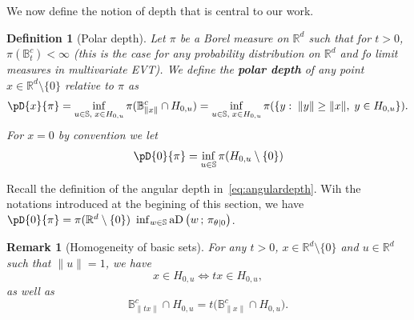\documentclass{article}
\numberwithin{equation}{section}
\newtheorem{definition}{Definition}[section]
\newtheorem{remark}{Remark}[section]
\newcommand{\rset}{\mathbb{R}}
\newcommand{\sphere}{\mathbb{S}}
\newcommand{\ball}{\mathbb{B}}
\newcommand{\AHS}[1]{H_{0, {#1}} }
\newcommand{\coD}[2]{\pD{#1}{#2}}
\newcommand{\aD}[2]{{\mathrm{aD}}\left({#1}\,;\,{#2}\right)}
\begin{document}

We now define the  notion of depth that is central to our work.
\begin{definition}[Polar depth]\label{def:coD}
    Let $\pi$ be a Borel measure on $\rset^d$ such that for $t>0$,
    $\pi(\ball_t^c)<\infty$ (this is the case for any probability
    distribution on $\rset^d$ and fo limit measures in multivariate EVT). We define the \textbf{polar depth}
    of any point $x\in\rset^d\setminus\{0\}$ relative to $\pi$ as
    \begin{equation}
        \label{eq:codepth}
            \coD{x}{\pi}  = \inf_{u \in\sphere,\; x \in \AHS{u} }\pi(
            \ball_{\|x\|}^c\cap \AHS{u} )    
             = \inf_{u\in\sphere , \; x \in \AHS{u} }\pi(\{y:\;  \|y\|  \ge
            \|x\|, \;y \in \AHS{u}\}).
          \end{equation}
          For $x=0$ by convention we let
          $$
\coD{0}{\pi} = \inf_{u \in\sphere }\pi(\AHS{u}\setminus\{0\} ) 
$$

\end{definition}

Recall the definition of the angular depth in~\eqref{eq:angulardepth}.
 Wih  the notations introduced at the begining of this section,  we have
$\coD{0}{\pi} =  \pi(\rset^d\setminus\{0\} ) ~\inf_{w\in\sphere}\aD{w}{\pi_{\theta|0}}$.


\begin{remark}[Homogeneity of basic sets]\label{rem:homog-basic-set}
    For any $t>0$, $x\in\rset^d\setminus \{0\}$ and $u\in \rset^d$ such that  $\|u\| = 1$, we have
    \begin{equation}\label{eq:homogeneity_halfspaces}
        x \in \AHS{u}\iff tx \in \AHS{u},
    \end{equation}
     as well as
     $$ \ball_{\|tx\|}^c\cap \AHS{u}  = t \Big( \ball_{\|x\|}^c\cap \AHS{u}\Big). $$
\end{remark}
\end{document}
